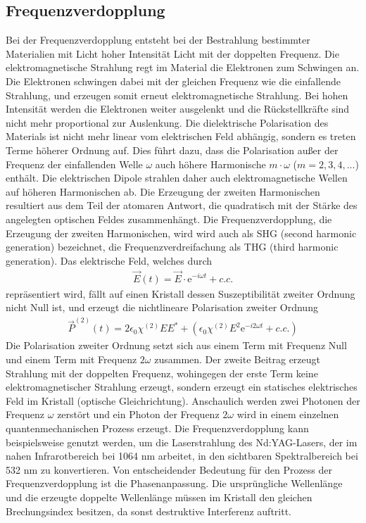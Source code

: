 \documentclass[twoside,colorback,accentcolor=tud4c,11pt]{tudreport}
\begin{document}
\subsection{Frequenzverdopplung}\label{freq}
Bei der Frequenzverdopplung entsteht bei der Bestrahlung bestimmter Materialien mit Licht hoher Intensität Licht mit der doppelten Frequenz. Die elektromagnetische Strahlung regt im Material die Elektronen zum Schwingen an. Die Elektronen schwingen dabei mit der gleichen Frequenz wie die einfallende Strahlung, und erzeugen somit erneut elektromagnetische Strahlung. Bei hohen Intensität werden die Elektronen weiter ausgelenkt und die Rückstellkräfte sind nicht mehr proportional zur Auslenkung. Die dielektrische Polarisation des Materials ist nicht mehr linear vom elektrischen Feld abhängig, sondern es treten Terme höherer Ordnung auf. Dies führt dazu, dass die Polarisation außer der Frequenz der einfallenden Welle $\omega$ auch höhere Harmonische $m\cdot \omega$ ($m=2,3,4,...$) enthält. Die elektrischen Dipole strahlen daher auch elektromagnetische Wellen auf höheren Harmonischen ab. Die Erzeugung der zweiten Harmonischen resultiert aus dem Teil der atomaren Antwort, die quadratisch mit der Stärke des angelegten optischen Feldes zusammenhängt. Die Frequenzverdopplung, die Erzeugung der zweiten Harmonischen, wird wird auch als SHG (second harmonic generation) bezeichnet, die Frequenzverdreifachung als THG (third harmonic generation). 
Das elektrische Feld, welches durch
\begin{align*}
\vec{E}(t)=\vec{E}\cdot\text{e}^{-i\omega t} + c.c.
\end{align*}
repräsentiert wird, fällt auf einen Kristall dessen Suszeptibilität zweiter Ordnung nicht Null ist, und erzeugt die nichtlineare Polarisation zweiter Ordnung
\begin{align*}
\vec{P}^{(2)}(t)=2\epsilon_0\chi^{(2)}EE^*+\left(\epsilon_0\chi^{(2)}E^2\text{e}^{-i2\omega t}+c.c.\right)
\end{align*} 
Die Polarisation zweiter Ordnung setzt sich aus einem Term mit Frequenz Null und einem Term mit Frequenz $2\omega$ zusammen. Der zweite Beitrag erzeugt Strahlung mit der doppelten Frequenz, wohingegen der erste Term keine elektromagnetischer Strahlung erzeugt, sondern erzeugt ein statisches elektrisches Feld im Kristall (optische Gleichrichtung).
Anschaulich werden zwei Photonen der Frequenz $\omega$ zerstört und ein Photon der Frequenz $2\omega$ wird in einem einzelnen quantenmechanischen Prozess erzeugt. Die Frequenzverdopplung kann beispielsweise genutzt werden, um die Laserstrahlung des Nd:YAG-Lasers, der im nahen Infrarotbereich bei 1064 nm arbeitet, in den sichtbaren Spektralbereich bei 532 nm zu konvertieren. Von entscheidender Bedeutung für den Prozess der Frequenzverdopplung ist die Phasenanpassung. Die ursprüngliche Wellenlänge und die erzeugte doppelte Wellenlänge müssen im Kristall den gleichen Brechungsindex besitzen, da sonst destruktive Interferenz auftritt.
\cite{2,6,7}	
\end{document}
